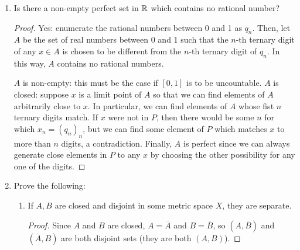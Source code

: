 \begin{enumerate}
\begin{proof}
Suppose that $x$ contained a digit other than 4 or 7. That is, suppose $x = 0.x_1 x_2 x_3 \dots x_k\dots$ with $x_k \not\in \{4, 7\}$. Then, choosing a neighbourhood of size $2 \cdot 10^{-(k+1)}$ assures that either $x_k$ or $x_{k+1}$ will not be either a 4 or a 7. Thus, the neighbourhood will contain no elements in $E$. Thus, the contrapositive states that every limit point of $E$ must be in $E$, so $E$ is closed and thus compact.

Let $x \in E'$. We can find elements $x_n$ in $E$ arbitrarily close to $x$ by switching the $n$-th digit between a 4 and a 7, acquiring elements in $E$ which are a distance $3 \cdot 10^{-n}$ from $x$. Thus, $E$ is also perfect.
\end{proof}

\item %
Is there a non-empty perfect set in $\mathbb{R}$ which contains no rational number?

\begin{proof}
Yes: enumerate the rational numbers between 0 and 1 as $q_n$. Then, let $A$ be the set of real numbers between 0 and 1 such that the $n$-th ternary digit of any $x \in A$ is chosen to be different from the $n$-th ternary digit of $q_n$. In this way, $A$ contains no rational numbers.

$A$ is non-empty: this must be the case if $[0, 1]$ is to be uncountable. $A$ is closed: suppose $x$ is a limit point of $A$ so that we can find elements of $A$ arbitrarily close to $x$. In particular, we can find elements of $A$ whose fist $n$ ternary digits match. If $x$ were not in $P$, then there would be some $n$ for which $x_n = (q_n)_n$, but we can find some element of $P$ which matches $x$ to more than $n$ digits, a contradiction. Finally, $A$ is perfect since we can always generate close elements in $P$ to any $x$ by choosing the other possibility for any one of the digits. 
\end{proof}

\item %
Prove the following:
\begin{enumerate}
\item If $A, B$ are closed and disjoint in some metric space $X$, they are separate.

\begin{proof}
Since $A$ and $B$ are closed, $A = \overline{A}$ and $B = \overline{B}$, so $(A, \overline{B})$ and $(\overline{A}, B)$ are both disjoint sets (they are both $(A, B)$).
\end{proof}


\end{enumerate}
\end{enumerate}
